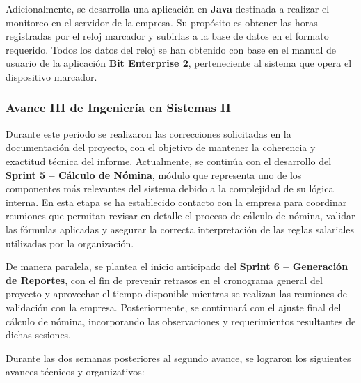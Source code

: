 Adicionalmente, se desarrolla una aplicación en \textbf{Java} destinada a realizar el monitoreo en el servidor de la empresa. Su propósito es obtener las horas registradas por el reloj marcador y subirlas a la base de datos en el formato requerido. Todos los datos del reloj se han obtenido con base en el manual de usuario de la aplicación \textbf{Bit Enterprise 2}, perteneciente al sistema que opera el dispositivo marcador.

\subsubsection{Avance III de Ingeniería en Sistemas II}

Durante este periodo se realizaron las correcciones solicitadas en la documentación del proyecto, con el objetivo de mantener la coherencia y exactitud técnica del informe.
Actualmente, se continúa con el desarrollo del \textbf{Sprint 5 – Cálculo de Nómina}, módulo que representa uno de los componentes más relevantes del sistema debido a la complejidad de su lógica interna.
En esta etapa se ha establecido contacto con la empresa para coordinar reuniones que permitan revisar en detalle el proceso de cálculo de nómina, validar las fórmulas aplicadas y asegurar la correcta interpretación de las reglas salariales utilizadas por la organización.

De manera paralela, se plantea el inicio anticipado del \textbf{Sprint 6 – Generación de Reportes}, con el fin de prevenir retrasos en el cronograma general del proyecto y aprovechar el tiempo disponible mientras se realizan las reuniones de validación con la empresa.
Posteriormente, se continuará con el ajuste final del cálculo de nómina, incorporando las observaciones y requerimientos resultantes de dichas sesiones.

Durante las dos semanas posteriores al segundo avance, se lograron los siguientes avances técnicos y organizativos:

